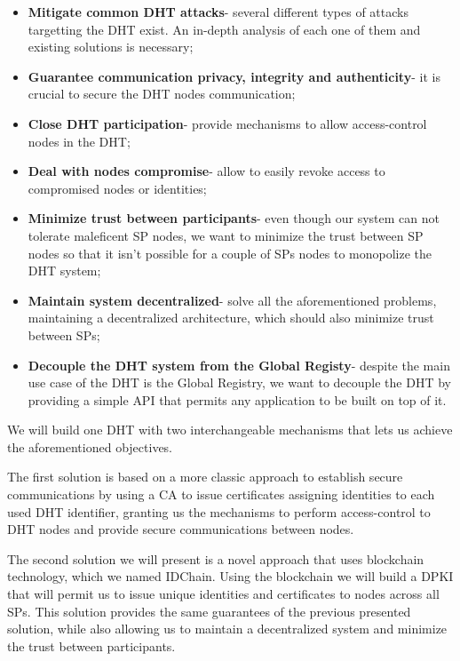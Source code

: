 \begin{itemize}
  \item \textbf{Mitigate common \ac{DHT} attacks}- several different types of attacks targetting the \ac{DHT} exist. An in-depth analysis of each one of them and existing solutions is necessary;
	\item \textbf{Guarantee communication privacy, integrity and authenticity}- it is crucial to secure the \ac{DHT} nodes communication;
	\item \textbf{Close DHT participation}- provide mechanisms to allow access-control nodes in the \ac{DHT};
	\item \textbf{Deal with nodes compromise}- allow to easily revoke access to compromised nodes or identities;
  \item \textbf{Minimize trust between participants}- even though our system can not tolerate maleficent \ac{SP} nodes, we want to minimize the trust between \ac{SP} nodes so that it isn't possible for a couple of \acp{SP} nodes to monopolize the DHT system;
  \item \textbf{Maintain system decentralized}- solve all the aforementioned problems, maintaining a decentralized architecture, which should also minimize trust between \acp{SP};
  \item \textbf{Decouple the DHT system from the Global Registy}- despite the main use case of the DHT is the Global Registry, we want to decouple the DHT by providing a simple \ac{API} that permits any application to be built on top of it.
\end{itemize}

We will build one DHT with two interchangeable mechanisms that lets us achieve the aforementioned objectives.

The first solution is based on a more classic approach to establish secure communications by using a \acl{CA} to issue certificates assigning identities to each used DHT identifier, granting us the mechanisms to perform access-control to \ac{DHT} nodes and provide secure communications between nodes.

The second solution we will present is a novel approach that uses blockchain technology, which we named IDChain.
Using the blockchain we will build a \ac{DPKI} that will permit us to issue unique identities and certificates to nodes across all \acp{SP}.
This solution provides the same guarantees of the previous presented solution, while also allowing us to maintain a decentralized system and minimize the trust between participants.

